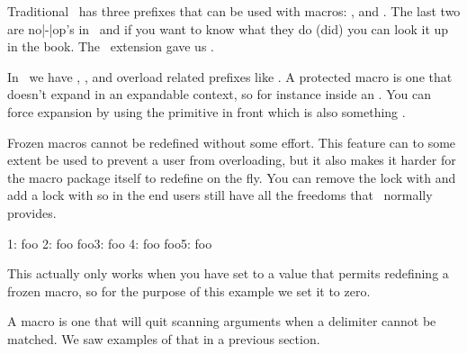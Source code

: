 \stopsection

\startsection[title=Prefixes]

Traditional \TEX\ has three prefixes that can be used with macros: \type {\global},
\type {\outer} and \type {\long}. The last two are no|-|op's in \LUAMETATEX\ and
if you want to know what they do (did) you can look it up in the \TEX book. The
\ETEX\ extension gave us \type {\protected}.

In \LUAMETATEX\ we have \type {\global}, \type {\protected}, \type {\tolerant}
and overload related prefixes like \type {\frozen}. A protected macro is one that
doesn't expand in an expandable context, so for instance inside an \type {\edef}.
You can force expansion by using the \type {\expand} primitive in front which is
also something \LUAMETATEX.

%
%
%

Frozen macros cannot be redefined without some effort. This feature can to some
extent be used to prevent a user from overloading, but it also makes it harder
for the macro package itself to redefine on the fly. You can remove the lock with
\typ {\unletfrozen} and add a lock with  so in the end users
still have all the freedoms that \TEX\ normally provides.

\startbuffer[example]
                  1: \meaning\foo
          \frozen\def\foo{foo} 2: \meaning\foo
     \unletfrozen    \foo      3: \meaning\foo
\protected\frozen\def\foo{foo} 4: \meaning\foo
     \unletfrozen    \foo      5: \meaning\foo
\stopbuffer

\typebuffer[example][option=TEX]

\startlines {} \getbuffer[example] \stoplines

This actually only works when you have set \type {\overloadmode} to a value that
permits redefining a frozen macro, so for the purpose of this example we set it
to zero.

A \type {\tolerant} macro is one that will quit scanning arguments when a
delimiter cannot be matched. We saw examples of that in a previous section.

